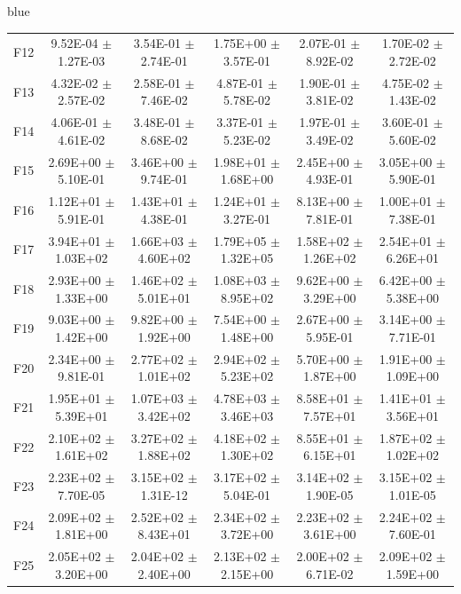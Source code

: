 \documentclass[journal, onecolumn]{IEEEtran}
\begin{document}
\begin{color}{blue}
\begin{table}[htbp!]
\begin{tabular}{c|ccccc}
		F12	 &	9.52E-04	$\pm$	1.27E-03	 &	3.54E-01	$\pm$	2.74E-01		 &	1.75E+00	$\pm$	3.57E-01		 &	2.07E-01	$\pm$	8.92E-02		 &	1.70E-02	$\pm$	2.72E-02	\\		
		F13	 &	4.32E-02	$\pm$	2.57E-02	 &	2.58E-01	$\pm$	7.46E-02		 &	4.87E-01	$\pm$	5.78E-02		 &	1.90E-01	$\pm$	3.81E-02		 &	4.75E-02	$\pm$	1.43E-02	\\		
		F14	 &	4.06E-01	$\pm$	4.61E-02	 &	3.48E-01	$\pm$	8.68E-02		 &	3.37E-01	$\pm$	5.23E-02		 &	1.97E-01	$\pm$	3.49E-02		 &	3.60E-01	$\pm$	5.60E-02	\\		
		F15	 &	2.69E+00	$\pm$	5.10E-01	 &	3.46E+00	$\pm$	9.74E-01		 &	1.98E+01	$\pm$	1.68E+00		 &	2.45E+00	$\pm$	4.93E-01		 &	3.05E+00	$\pm$	5.90E-01	\\		
		F16	 &	1.12E+01	$\pm$	5.91E-01	 &	1.43E+01	$\pm$	4.38E-01		 &	1.24E+01	$\pm$	3.27E-01		 &	8.13E+00	$\pm$	7.81E-01		 &	1.00E+01	$\pm$	7.38E-01	\\		
		F17	 &	3.94E+01	$\pm$	1.03E+02	 &	1.66E+03	$\pm$	4.60E+02		 &	1.79E+05	$\pm$	1.32E+05		 &	1.58E+02	$\pm$	1.26E+02		 &	2.54E+01	$\pm$	6.26E+01	\\		
		F18	 &	2.93E+00	$\pm$	1.33E+00	 &	1.46E+02	$\pm$	5.01E+01		 &	1.08E+03	$\pm$	8.95E+02		 &	9.62E+00	$\pm$	3.29E+00		 &	6.42E+00	$\pm$	5.38E+00	\\		
		F19	 &	9.03E+00	$\pm$	1.42E+00	 &	9.82E+00	$\pm$	1.92E+00		 &	7.54E+00	$\pm$	1.48E+00		 &	2.67E+00	$\pm$	5.95E-01		 &	3.14E+00	$\pm$	7.71E-01	\\		
		F20	 &	2.34E+00	$\pm$	9.81E-01	 &	2.77E+02	$\pm$	1.01E+02		 &	2.94E+02	$\pm$	5.23E+02		 &	5.70E+00	$\pm$	1.87E+00		 &	1.91E+00	$\pm$	1.09E+00	\\		
		F21	 &	1.95E+01	$\pm$	5.39E+01	 &	1.07E+03	$\pm$	3.42E+02		 &	4.78E+03	$\pm$	3.46E+03		 &	8.58E+01	$\pm$	7.57E+01		 &	1.41E+01	$\pm$	3.56E+01	\\		
		F22	 &	2.10E+02	$\pm$	1.61E+02	 &	3.27E+02	$\pm$	1.88E+02		 &	4.18E+02	$\pm$	1.30E+02		 &	8.55E+01	$\pm$	6.15E+01		 &	1.87E+02	$\pm$	1.02E+02	\\		
		F23	 &	2.23E+02	$\pm$	7.70E-05	 &	3.15E+02	$\pm$	1.31E-12		 &	3.17E+02	$\pm$	5.04E-01		 &	3.14E+02	$\pm$	1.90E-05		 &	3.15E+02	$\pm$	1.01E-05	\\		
		F24	 &	2.09E+02	$\pm$	1.81E+00	 &	2.52E+02	$\pm$	8.43E+01		 &	2.34E+02	$\pm$	3.72E+00		 &	2.23E+02	$\pm$	3.61E+00		 &	2.24E+02	$\pm$	7.60E-01	\\		
		F25	 &	2.05E+02	$\pm$	3.20E+00	 &	2.04E+02	$\pm$	2.40E+00		 &	2.13E+02	$\pm$	2.15E+00		 &	2.00E+02	$\pm$	6.71E-02		 &	2.09E+02	$\pm$	1.59E+00	\\		

\end{tabular}
\end{table}
\end{color}
\end{document}
